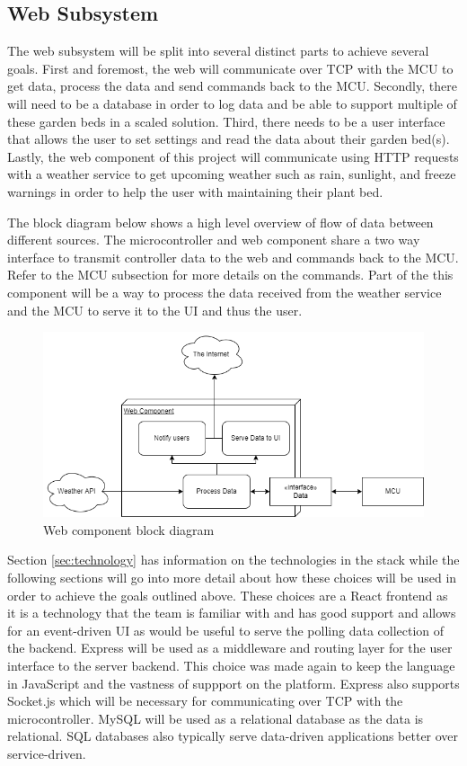 \subsection{Web Subsystem}
\label{sec:web_subsystem}
The web subsystem will be split into several distinct parts to achieve several goals. First and foremost, the web will communicate over TCP with the MCU to get data, process the data and send commands back to the MCU. Secondly, there will need to be a database in order to log data and be able to support multiple of these garden beds in a scaled solution. Third, there needs to be a user interface that allows the user to set settings and read the data about their garden bed(s). Lastly, the web component of this project will communicate using HTTP requests with a weather service to get upcoming weather such as rain, sunlight, and freeze warnings in order to help the user with maintaining their plant bed.


The block diagram below shows a high level overview of flow of data between different sources. The microcontroller and web component share a two way interface to transmit controller data to the web and commands back to the MCU. Refer to the MCU subsection for more details on the commands. Part of the this component will be a way to process the data received from the weather service and the MCU to serve it to the UI and thus the user. 
\begin{figure}[H]
    \caption{Web component block diagram}
    \centering
    \includegraphics[width=\textwidth]{images/WebBlock.png}
\end{figure}
Section \ref{sec:technology} has information on the technologies in the stack while the following sections will go into more detail about how these choices will be used in order to achieve the goals outlined above. These choices are a React frontend as it is a technology that the team is familiar with and has good support and allows for an event-driven UI as would be useful to serve the polling data collection of the backend. Express will be used as a middleware and routing layer for the user interface to the server backend. This choice was made again to keep the language in JavaScript and the vastness of suppport on the platform. Express also supports Socket.js which will be necessary for communicating over TCP with the microcontroller. MySQL will be used as a relational database as the data is relational. SQL databases also typically serve data-driven applications better over service-driven.
